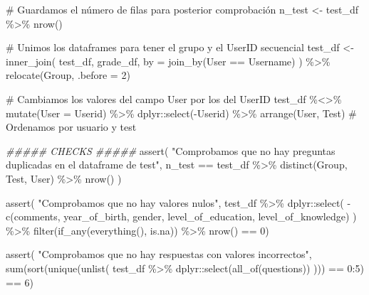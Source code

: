 \documentclass[
  12pt,
  a4paper,
  extrafontsizes,
  onecolumn,
  openright]{memoir}
\newenvironment{Shaded}{\begin{snugshade}}{\end{snugshade}}
\newcommand{\AttributeTok}[1]{\textcolor[rgb]{0.40,0.45,0.13}{#1}}
\newcommand{\CommentTok}[1]{\textcolor[rgb]{0.37,0.37,0.37}{#1}}
\newcommand{\DecValTok}[1]{\textcolor[rgb]{0.68,0.00,0.00}{#1}}
\newcommand{\DocumentationTok}[1]{\textcolor[rgb]{0.37,0.37,0.37}{\textit{#1}}}
\newcommand{\FunctionTok}[1]{\textcolor[rgb]{0.28,0.35,0.67}{#1}}
\newcommand{\NormalTok}[1]{\textcolor[rgb]{0.00,0.23,0.31}{#1}}
\newcommand{\OtherTok}[1]{\textcolor[rgb]{0.00,0.23,0.31}{#1}}
\newcommand{\SpecialCharTok}[1]{\textcolor[rgb]{0.37,0.37,0.37}{#1}}
\newcommand{\StringTok}[1]{\textcolor[rgb]{0.13,0.47,0.30}{#1}}
\begin{document}
\begin{Shaded}
\begin{Highlighting}[]
\CommentTok{\# Guardamos el número de filas para posterior comprobación}
\NormalTok{n\_test }\OtherTok{\textless{}{-}}\NormalTok{ test\_df }\SpecialCharTok{\%\textgreater{}\%} \FunctionTok{nrow}\NormalTok{()}

\CommentTok{\# Unimos los dataframes para tener el grupo y el UserID secuencial}
\NormalTok{test\_df }\OtherTok{\textless{}{-}} \FunctionTok{inner\_join}\NormalTok{(}
\NormalTok{    test\_df, grade\_df, }\AttributeTok{by =} \FunctionTok{join\_by}\NormalTok{(User }\SpecialCharTok{==}\NormalTok{ Username)}
\NormalTok{    ) }\SpecialCharTok{\%\textgreater{}\%} \FunctionTok{relocate}\NormalTok{(Group, }\AttributeTok{.before =} \DecValTok{2}\NormalTok{)}

\CommentTok{\# Cambiamos los valores del campo User por los del UserID}
\NormalTok{test\_df }\SpecialCharTok{\%\textless{}\textgreater{}\%}
    \FunctionTok{mutate}\NormalTok{(}\AttributeTok{User =}\NormalTok{ Userid) }\SpecialCharTok{\%\textgreater{}\%}
\NormalTok{    dplyr}\SpecialCharTok{::}\FunctionTok{select}\NormalTok{(}\SpecialCharTok{{-}}\NormalTok{Userid) }\SpecialCharTok{\%\textgreater{}\%}
    \FunctionTok{arrange}\NormalTok{(User, Test) }\CommentTok{\# Ordenamos por usuario y test}


\DocumentationTok{\#\#\#\#\# CHECKS \#\#\#\#\#}
\FunctionTok{assert}\NormalTok{(}
    \StringTok{"Comprobamos que no hay preguntas duplicadas en el dataframe de test"}\NormalTok{,}
\NormalTok{    n\_test }\SpecialCharTok{==}\NormalTok{ test\_df }\SpecialCharTok{\%\textgreater{}\%}
    \FunctionTok{distinct}\NormalTok{(Group, Test, User) }\SpecialCharTok{\%\textgreater{}\%}
    \FunctionTok{nrow}\NormalTok{()}
\NormalTok{)}

\FunctionTok{assert}\NormalTok{(}
    \StringTok{"Comprobamos que no hay valores nulos"}\NormalTok{,}
\NormalTok{    test\_df }\SpecialCharTok{\%\textgreater{}\%} 
\NormalTok{    dplyr}\SpecialCharTok{::}\FunctionTok{select}\NormalTok{(}
        \SpecialCharTok{{-}}\FunctionTok{c}\NormalTok{(comments, year\_of\_birth, gender, level\_of\_education, level\_of\_knowledge)}
\NormalTok{    ) }\SpecialCharTok{\%\textgreater{}\%} \FunctionTok{filter}\NormalTok{(}\FunctionTok{if\_any}\NormalTok{(}\FunctionTok{everything}\NormalTok{(), is.na)) }\SpecialCharTok{\%\textgreater{}\%} \FunctionTok{nrow}\NormalTok{() }\SpecialCharTok{==} \DecValTok{0}\NormalTok{)}


\FunctionTok{assert}\NormalTok{(}
    \StringTok{"Comprobamos que no hay respuestas con valores incorrectos"}\NormalTok{,}
    \FunctionTok{sum}\NormalTok{(}\FunctionTok{sort}\NormalTok{(}\FunctionTok{unique}\NormalTok{(}\FunctionTok{unlist}\NormalTok{(}
\NormalTok{        test\_df }\SpecialCharTok{\%\textgreater{}\%}\NormalTok{ dplyr}\SpecialCharTok{::}\FunctionTok{select}\NormalTok{(}\FunctionTok{all\_of}\NormalTok{(questions))}
\NormalTok{    ))) }\SpecialCharTok{==} \DecValTok{0}\SpecialCharTok{:}\DecValTok{5}\NormalTok{) }\SpecialCharTok{==} \DecValTok{6}\NormalTok{)}



\end{Highlighting}
\end{Shaded}
\end{document}
